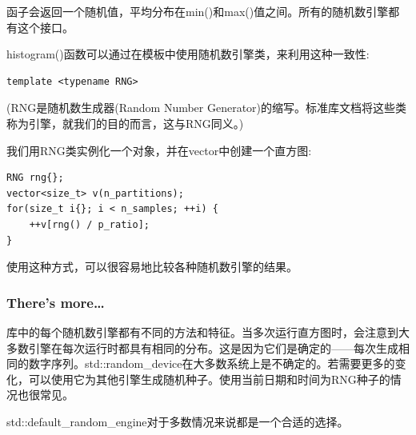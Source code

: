 函子会返回一个随机值，平均分布在min()和max()值之间。所有的随机数引擎都有这个接口。

histogram()函数可以通过在模板中使用随机数引擎类，来利用这种一致性:

\begin{lstlisting}[style=styleCXX]
template <typename RNG>
\end{lstlisting}

(RNG是随机数生成器(Random Number Generator)的缩写。标准库文档将这些类称为引擎，就我们的目的而言，这与RNG同义。)

我们用RNG类实例化一个对象，并在vector中创建一个直方图:

\begin{lstlisting}[style=styleCXX]
RNG rng{};
vector<size_t> v(n_partitions);
for(size_t i{}; i < n_samples; ++i) {
	++v[rng() / p_ratio];
}
\end{lstlisting}

使用这种方式，可以很容易地比较各种随机数引擎的结果。


\subsubsection{There's more…}

库中的每个随机数引擎都有不同的方法和特征。当多次运行直方图时，会注意到大多数引擎在每次运行时都具有相同的分布。这是因为它们是确定的——每次生成相同的数字序列。std::random\_device在大多数系统上是不确定的。若需要更多的变化，可以使用它为其他引擎生成随机种子。使用当前日期和时间为RNG种子的情况也很常见。

std::default\_random\_engine对于多数情况来说都是一个合适的选择。


















